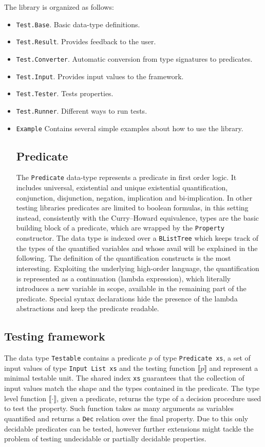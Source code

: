 \documentclass[10pt,a4paper]{report}
\begin{document}
The library is organized as follows:
\begin{itemize}
	\item \texttt{Test.Base}. Basic data-type definitions.
	\item \texttt{Test.Result}. Provides feedback to the user.
	\item \texttt{Test.Converter}. Automatic conversion from type signatures to predicates.
	\item \texttt{Test.Input}. Provides input values to the framework.
	\item \texttt{Test.Tester}. Tests properties.
	\item \texttt{Test.Runner}. Different ways to run tests.
	\item \texttt{Example} Contains several simple examples about how to use the library.
	
\subsection*{Predicate}
The \texttt{Predicate} data-type represents a predicate in first order logic.
It includes universal, existential and unique existential quantification, conjunction, disjunction, negation, implication and bi-implication.
In other testing libraries predicates are limited to boolean formulas, in this setting instead, consistently with the Curry–Howard equivalence, types are the basic building block of a predicate, which are wrapped by the \texttt{Property} constructor.
The data type is indexed over a \texttt{BListTree} which keeps track of the types of the quantified variables and whose avail will be explained in the following.
The definition of the quantification constructs is the most interesting.
Exploiting the underlying high-order language, the quantification is represented as a continuation (lambda expression), which literally introduces a new variable in scope, available in the remaining part of the predicate.
Special syntax declarations hide the presence of the lambda abstractions and keep the predicate readable.


\end{itemize}

\subsection*{Testing framework}
The data type \texttt{Testable} contains a predicate $p$ of type \texttt{Predicate xs}, a set of input values of type \texttt{Input List xs} and the testing function $\llbracket p \rrbracket$ and represent a minimal testable unit. The shared index \texttt{xs} guarantees that the collection of input values match the shape and the types contained in the predicate.
The type level function $\llbracket \cdot \rrbracket$, given a predicate, returns the type of a decision procedure used to test the property.
Such function takes as many arguments as variables quantified and returns a \texttt{Dec} relation over the final property. Due to this only decidable predicates can be tested, however further extensions might tackle the problem of testing undecidable or partially decidable properties.
\end{document}
